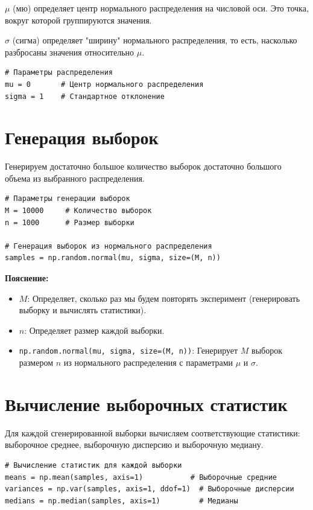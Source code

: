 \documentclass[14pt]{extreport}
\begin{document}
$\mu$ (мю) определяет центр нормального распределения на числовой оси. Это точка, вокруг которой группируются значения.

$\sigma$ (сигма) определяет "ширину" нормального распределения, то есть, насколько разбросаны значения относительно $\mu$.

\begin{verbatim}
# Параметры распределения
mu = 0       # Центр нормального распределения
sigma = 1    # Стандартное отклонение
\end{verbatim}

\section{Генерация выборок}

Генерируем достаточно большое количество выборок достаточно большого объема из выбранного распределения.

\begin{verbatim}
# Параметры генерации выборок
M = 10000     # Количество выборок
n = 1000      # Размер выборки

# Генерация выборок из нормального распределения
samples = np.random.normal(mu, sigma, size=(M, n))
\end{verbatim}

\textbf{Пояснение:}

\begin{itemize}
    \item $M$: Определяет, сколько раз мы будем повторять эксперимент (генерировать выборку и вычислять статистики).
    \item $n$: Определяет размер каждой выборки.
    \item \texttt{np.random.normal(mu, sigma, size=(M, n))}: Генерирует $M$ выборок размером $n$ из нормального распределения с параметрами $\mu$ и $\sigma$.
\end{itemize}

\section{Вычисление выборочных статистик}

Для каждой сгенерированной выборки вычисляем соответствующие статистики: выборочное среднее, выборочную дисперсию и выборочную медиану.

\begin{verbatim}
# Вычисление статистик для каждой выборки
means = np.mean(samples, axis=1)           # Выборочные средние
variances = np.var(samples, axis=1, ddof=1)  # Выборочные дисперсии
medians = np.median(samples, axis=1)         # Медианы
\end{verbatim}
\end{document}
